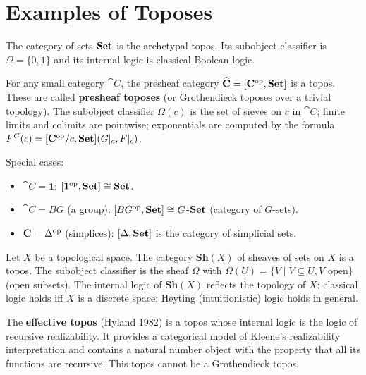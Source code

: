 \section{Examples of Toposes}

\begin{example}[$\Set$]
The category of sets $\Set$ is the archetypal topos. Its subobject classifier is $\Omega = \{0,1\}$ and its internal logic is classical Boolean logic.
\end{example}

\begin{example}
For any small category $\cat{C}$, the presheaf category $\widehat{\mathbf{C}} = [\mathbf{C}^{\mathrm{op}}, \mathbf{Set}]$ is a topos. These are called \textbf{presheaf toposes} (or Grothendieck toposes over a trivial topology). The subobject classifier $\Omega(c)$ is the set of sieves on $c$ in $\cat{C}$; finite limits and colimits are pointwise; exponentials are computed by the formula $F^G(c) = [\mathbf{C}^{\mathrm{op}}/c, \mathbf{Set}](G|_{c}, F|_{c})$.

Special cases:
\begin{itemize}
  \item $\cat{C} = \mathbf{1}$: $[\mathbf{1}^{\mathrm{op}}, \mathbf{Set}] \cong \mathbf{Set}$.
  \item $\cat{C} = BG$ (a group): $[BG^{\mathrm{op}}, \mathbf{Set}] \cong G$-$\Set$ (category of $G$-sets).
  \item $\mathbf{C} = \Delta^{\mathrm{op}}$ (simplices): $[\Delta, \mathbf{Set}]$ is the category of simplicial sets.
\end{itemize}
\end{example}

\begin{example}
Let $X$ be a topological space. The category $\mathbf{Sh}(X)$ of sheaves of sets on $X$ is a topos. The subobject classifier is the sheaf $\Omega$ with $\Omega(U) = \{V \mid V \subseteq U, V \text{ open}\}$ (open subsets). The internal logic of $\mathbf{Sh}(X)$ reflects the topology of $X$: classical logic holds iff $X$ is a discrete space; Heyting (intuitionistic) logic holds in general.
\end{example}

\begin{example}
The \textbf{effective topos} (Hyland 1982) is a topos whose internal logic is the logic of recursive realizability. It provides a categorical model of Kleene's realizability interpretation and contains a natural number object with the property that all its functions are recursive. This topos cannot be a Grothendieck topos.
\end{example}

